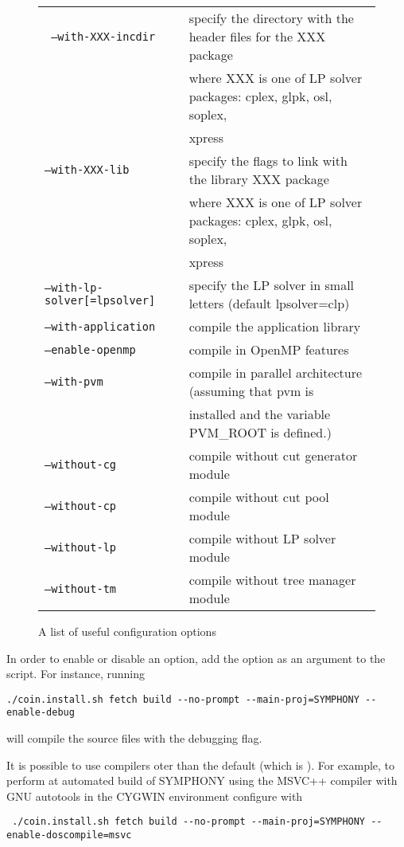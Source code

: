 \begin{figure}[htb]
\begin{tabular}{ll}
\hline
\texttt{ --with-XXX-incdir} &  specify the directory with the header files for the XXX package \\ 
&where XXX is one of LP solver packages: cplex, glpk, osl, soplex, \\ 
& xpress \\
\texttt{--with-XXX-lib} &  specify the flags to link with the library  
XXX package \\ 
&where XXX is one of LP solver packages: cplex, glpk, osl, soplex, \\ 
& xpress \\
\texttt{--with-lp-solver[=lpsolver]} &  specify the LP solver in small 
letters (default lpsolver=clp) \\
\texttt{--with-application} &  compile the application library \\
\hline
\texttt{--enable-openmp} &   compile in OpenMP features \\
\texttt{--with-pvm } &  compile in parallel architecture (assuming that pvm is \\ 
&installed and the variable PVM\_ROOT is defined.) \\
\texttt{--without-cg} &  compile without cut generator module \\
\texttt{--without-cp} &  compile without cut pool module \\
\texttt{--without-lp} &  compile without LP solver module \\
\texttt{--without-tm} &  compile without tree manager module
\end{tabular}
\caption{A list of useful configuration options \label{conf_opts}}
\end{figure}

In order to enable or disable an option, add the option as an argument to the
 script. For instance, running 
{\color{Brown}
\begin{verbatim}
./coin.install.sh fetch build --no-prompt --main-proj=SYMPHONY --enable-debug
\end{verbatim}
}
will compile the source files with the debugging flag.

It is possible to use compilers oter than the default (which is ).
For example, to perform at automated build of SYMPHONY using the MSVC++
compiler  with GNU autotools in the CYGWIN environment configure with
{\color{Brown}
\begin{verbatim}
 ./coin.install.sh fetch build --no-prompt --main-proj=SYMPHONY --enable-doscompile=msvc
\end{verbatim}
}

